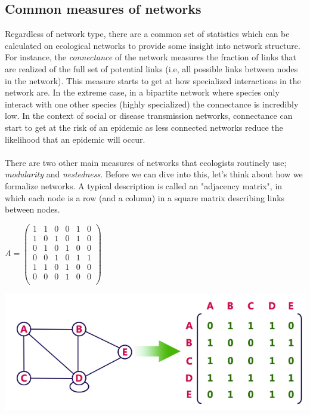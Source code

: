 \documentclass[12pt]{article}
\begin{document}
\bigskip
\subsection*{Common measures of networks}

Regardless of network type, there are a common set of statistics which can be calculated on ecological networks to provide some insight into network structure. For instance, the \textit{connectance} of the network measures the fraction of links that are realized of the full set of potential links (i.e, all possible links between nodes in the network). This measure starts to get at how specialized interactions in the network are. In the extreme case, in a bipartite network where species only interact with one other species (highly specialized) the connectance is incredibly low. In the context of social or disease transmission networks, connectance can start to get at the risk of an epidemic as less connected networks reduce the likelihood that an epidemic will occur. 






\paragraph*{}

There are two other main measures of networks that ecologists routinely use; \textit{modularity} and \textit{nestedness}. Before we can dive into this, let's think about how we formalize networks. A typical description is called an "adjacency matrix", in which each node is a row (and a column) in a square matrix describing links between nodes. 


$A = \begin{pmatrix}
    1&1&0&0&1&0\\
    1&0&1&0&1&0\\
    0&1&0&1&0&0\\
    0&0&1&0&1&1\\
    1&1&0&1&0&0\\
    0&0&0&1&0&0\\
\end{pmatrix}$





\includegraphics[width=\textwidth]{figs/adjac.png}
\end{document}
